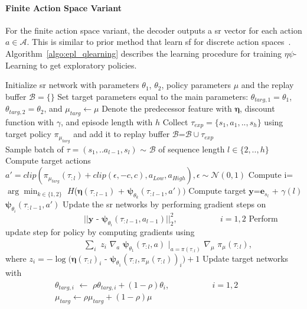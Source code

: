\documentclass{article}
\theoremstyle{plain}
\theoremstyle{definition}
\theoremstyle{remark}
\newcommand{\alg}{$\eta$$\psi$-Learning}
\begin{document}
\paragraph{Finite Action Space Variant}
For the finite action space variant, the decoder outputs a \gls{sr} vector for each action $a\in\mathcal{A}$. This is similar to prior method that learn \gls{sf} for discrete action spaces~\citep{lehnert2017advantages,barreto2017successor}. Algorithm~\ref{algo:epl_qlearning} describes the learning procedure for training \alg{} to get exploratory policies.
\begin{algorithm}[tb]
\caption{\alg{}: Infinite Action Space Framework}
\label{algo:epl_pg}
\begin{algorithmic}[1]
    \STATE Initialize \gls{sr} network with parameters $\theta_1$, $\theta_2$, policy parameters $\mu$ and the replay buffer $\mathcal{B}=\{\}$
    \STATE Set target parameters equal to the main parameters: $\theta_{targ,1}=\theta_1$, $\theta_{targ,2}=\theta_2$, and $\mu_{targ} \leftarrow \mu$
    \STATE Denote the predecessor feature with $\pmb{\eta}$, discount function with $\gamma$, and episode length with $h$
        \STATE Collect $\tau_{exp}=\{s_1,a_1,..,s_h\}$ using target policy $\pi_{\mu_{targ}}$ and add it to replay buffer $\mathcal{B}$=$\mathcal{B} \cup \tau_{exp}$
        \\
            \STATE Sample batch of $\tau=(s_1,..a_{l-1},s_l)$ $\sim$ $\mathcal{B}$ of sequence length $l \in \{2,..,h\}$
            \STATE Compute target actions $a' = clip(\pi_{\mu_{targ}}(\tau_{:l}) + clip(\epsilon, -c, c), a_{Low}, a_{High}), \epsilon\sim\mathcal{N}(0, 1)$
            \STATE Compute i=$\arg\min_{k \in \{ 1,2 \}}$ $H$($\pmb{\eta}(\tau_{:l-1})$ + $\pmb{\psi}_{\theta_k}(\tau_{:l-1}, a'))$ 
            \STATE Compute target $\pmb{y}$=$\pmb{e}_{s_l}$ + $\gamma(l)$ $\pmb{\psi}_{\theta_i}(\tau_{:l-1}, a')$
            \STATE Update the \gls{sr} networks by performing gradient steps on\\ ~~~~~~~~~~~~~~~~~~~$||\pmb{y}$ - $\pmb{\psi}_{\theta_i}(\tau_{:l-1}, a_{l-1})||_2^2$,~~~~~~~~~~ $i=1,2$
                \STATE Perform update step for policy by computing gradients using\\ ~~~~~~~~~~~~~~~~~~~$\sum_{i}$ $z_i$ $\nabla_a$ $\pmb{\psi}_{\theta_1}(\tau_{:l},a)$ $|_{a=\pi(\tau_{:l})}$ $\nabla_{\mu}$ $\pi_{\mu}(\tau_{:l})$,
                \\
                where $z_i = -\log(\pmb{\eta}(\tau_{:l})_i$ - $\pmb{\psi}_{\theta_1}(\tau_{:l}, \pi_{\mu}(\tau_{:l}))_i) + 1$
                \STATE Update target networks with \\
                ~~~~~~~~~~~~$\theta_{targ,i}$ $\leftarrow$ $\rho\theta_{targ,i} + (1 - \rho) \theta_{i}$,~~~~~~~~~~ $i=1,2$ \\
                ~~~~~~~~~~~~$\mu_{targ} \leftarrow \rho\mu_{targ} + (1 - \rho) \mu$
            \ENDIF
        \ENDFOR
    \ENDWHILE
\end{algorithmic}
\end{algorithm}
\end{document}
